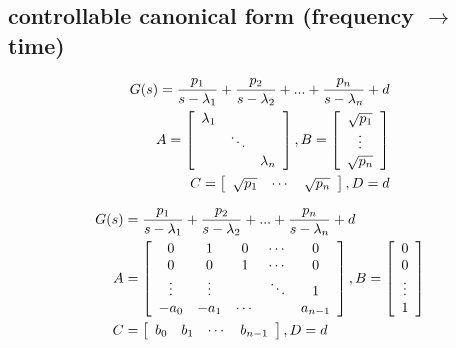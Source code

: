\subsection{controllable canonical form (frequency $\rightarrow$ time)}
\begin{align*}
    G(s) = \frac{p_1}{s-\lambda_1} + \frac{p_2}{s-\lambda_2} + ... + \frac{p_n}{s-\lambda_n} + d\\
    A = \left[\begin{array}{c c c}
        \lambda_1 & & \\
         & \ddots & \\
         & & \lambda_n
    \end{array}\right]
    ,
    B = \left[\begin{array}{c}
        \sqrt{p_1}\\
        \vdots\\
        \sqrt{p_n}
    \end{array}\right]
    \\
    C = \left[\begin{array}{c c c}
        \sqrt{p_1} & \cdots & \sqrt{p_n}
    \end{array}\right]
    ,
    D = d
\end{align*}

\begin{align*}
    G(s) &= \frac{p_1}{s-\lambda_1} + \frac{p_2}{s-\lambda_2} + ... + \frac{p_n}{s-\lambda_n} + d\\
    A &= \left[\begin{array}{c c c c c}
        0 & 1 & 0 & \cdots & 0\\
        0 & 0 & 1 & \cdots & 0\\
        \vdots & \vdots & & \ddots & 1\\
        -a_0 & -a_1 & \cdots & & a_{n-1}
    \end{array}\right]
    ,
    B = \left[\begin{array}{c}
        0\\
        0\\
        \vdots\\
        1
    \end{array}\right]
    \\
    C &= \left[\begin{array}{c c c c}
        b_0 & b_1 & \cdots & b_{n-1}
    \end{array}\right]
    ,
    D = d
\end{align*}